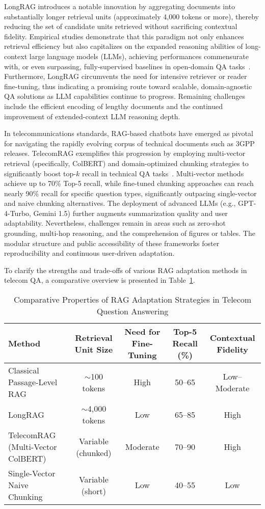 \documentclass[11pt]{article}
\begin{document}
LongRAG introduces a notable innovation by aggregating documents into substantially longer retrieval units (approximately 4,000 tokens or more), thereby reducing the set of candidate units retrieved without sacrificing contextual fidelity. Empirical studies demonstrate that this paradigm not only enhances retrieval efficiency but also capitalizes on the expanded reasoning abilities of long-context large language models (LLMs), achieving performances commensurate with, or even surpassing, fully-supervised baselines in open-domain QA tasks~\cite{ref34}. Furthermore, LongRAG circumvents the need for intensive retriever or reader fine-tuning, thus indicating a promising route toward scalable, domain-agnostic QA solutions as LLM capabilities continue to progress. Remaining challenges include the efficient encoding of lengthy documents and the continued improvement of extended-context LLM reasoning depth.

In telecommunications standards, RAG-based chatbots have emerged as pivotal for navigating the rapidly evolving corpus of technical documents such as 3GPP releases. TelecomRAG exemplifies this progression by employing multi-vector retrieval (specifically, ColBERT) and domain-optimized chunking strategies to significantly boost top-\(k\) recall in technical QA tasks~\cite{ref20}. Multi-vector methods achieve up to 70\% Top-5 recall, while fine-tuned chunking approaches can reach nearly 90\% recall for specific question types, significantly outpacing single-vector and naive chunking alternatives. The deployment of advanced LLMs (e.g., GPT-4-Turbo, Gemini 1.5) further augments summarization quality and user adaptability. Nevertheless, challenges remain in areas such as zero-shot grounding, multi-hop reasoning, and the comprehension of figures or tables. The modular structure and public accessibility of these frameworks foster reproducibility and continuous user-driven adaptation.

To clarify the strengths and trade-offs of various RAG adaptation methods in telecom QA, a comparative overview is presented in Table~\ref{tab:rag_methods}.

\begin{table}[ht]
\centering
\caption{Comparative Properties of RAG Adaptation Strategies in Telecom Question Answering}
\label{tab:rag_methods}
\begin{tabular}{|l|c|c|c|c|}
\hline
\textbf{Method} & \textbf{Retrieval Unit Size} & \textbf{Need for Fine-Tuning} & \textbf{Top-5 Recall (\%)} & \textbf{Contextual Fidelity} \\
\hline
Classical Passage-Level RAG & \(\sim\)100 tokens & High & 50--65 & Low--Moderate \\
LongRAG & \(\sim\)4,000 tokens & Low & 65--85 & High \\
TelecomRAG (Multi-Vector ColBERT) & Variable (chunked) & Moderate & 70--90 & High \\
Single-Vector Naive Chunking & Variable (short) & Low & 40--55 & Low \\
\hline
\end{tabular}
\end{table}
\end{document}
